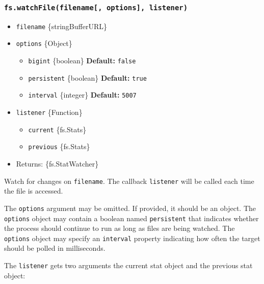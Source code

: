 \subsubsection{\texorpdfstring{\texttt{fs.watchFile(filename{[},\ options{]},\ listener)}}{fs.watchFile(filename{[}, options{]}, listener)}}\label{fs.watchfilefilename-options-listener}

\begin{itemize}
\tightlist
\item
  \texttt{filename} \{string\textbar Buffer\textbar URL\}
\item
  \texttt{options} \{Object\}

  \begin{itemize}
  \tightlist
  \item
    \texttt{bigint} \{boolean\} \textbf{Default:} \texttt{false}
  \item
    \texttt{persistent} \{boolean\} \textbf{Default:} \texttt{true}
  \item
    \texttt{interval} \{integer\} \textbf{Default:} \texttt{5007}
  \end{itemize}
\item
  \texttt{listener} \{Function\}

  \begin{itemize}
  \tightlist
  \item
    \texttt{current} \{fs.Stats\}
  \item
    \texttt{previous} \{fs.Stats\}
  \end{itemize}
\item
  Returns: \{fs.StatWatcher\}
\end{itemize}

Watch for changes on \texttt{filename}. The callback \texttt{listener}
will be called each time the file is accessed.

The \texttt{options} argument may be omitted. If provided, it should be
an object. The \texttt{options} object may contain a boolean named
\texttt{persistent} that indicates whether the process should continue
to run as long as files are being watched. The \texttt{options} object
may specify an \texttt{interval} property indicating how often the
target should be polled in milliseconds.

The \texttt{listener} gets two arguments the current stat object and the
previous stat object:

